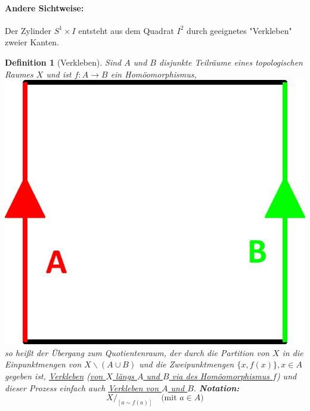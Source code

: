 \documentclass[a4paper,11pt,notitlepage]{report}
\newtheorem{definition}{Definition}[chapter]
\begin{document}
\paragraph{Andere Sichtweise:}
Der Zylinder $S^1 \times I$ entsteht aus dem Quadrat $I^2$ durch geeignetes "Verkleben" zweier Kanten. 

\begin{definition}[Verkleben]
Sind $A$ und $B$ disjunkte Teilräume eines topologischen Raumes $X$ und ist $f \colon A \rightarrow B$ ein Homöomorphismus, \includegraphics[scale=0.2]{images/Def_Verkleben.jpg} so heißt der Übergang zum Quotientenraum, der durch die Partition von $X$ in die Einpunktmengen von $X \backslash (A \cup B)$ und die Zweipunktmengen $\{x,f(x)\}, x \in A$ gegeben ist, \underline{Verkleben} (\underline{von $X$ längs $A$ und $B$ via des Homöomorphismus $f$}) und dieser Prozess einfach auch \underline{Verkleben von $A$ und $B$}.
\newline
\textbf{Notation:}
$$X/_{[a \sim f(a)]} \quad \text{(mit $a \in A$)}$$
\end{definition}
\end{document}
